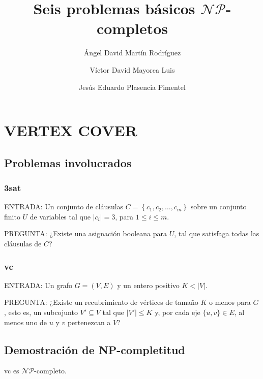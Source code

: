 \documentclass[11pt, a4paper]{memoir}
\title{\Huge Seis problemas básicos $\mathcal{NP}$-completos}
\author{Ángel David Martín Rodríguez}
\author{Víctor David Mayorca Luis}
\author{Jesús Eduardo Plasencia Pimentel}
\affil{Grado en Ingeniería Informática. Universidad de La Laguna}
\begin{document}
\maketitle

\chapter{VERTEX COVER}

\section{Problemas involucrados}

\subsection*{\gls{3sat}}

\noindent ENTRADA: Un conjunto de cláusulas $C=\left \{c_1, c_2, \dots, c_m \right \}$ sobre un conjunto finito $U$ de variables tal que $|c_i|=3$, para $1\le i \le m$.

\noindent PREGUNTA: ¿Existe una asignación booleana para $U$, tal que satisfaga todas las cláusulas de $C$? 

\subsection*{\gls{vc}}

\noindent ENTRADA: Un grafo $G = (V,E)$ y un entero positivo $K < |V|$.

\noindent PREGUNTA: ¿Existe un recubrimiento de vértices de tamaño $K$ o menos para $G$, esto es, un subcojunto $V' \subseteq V$ tal que $|V'|\le K$ y, por cada eje $\{u,v\} \in E$, al menos uno de $u$ y $v$ pertenezcan a $V$?

\section{Demostración de NP-completitud}

\begin{thm}
	\gls{vc} es $\mathcal{NP}$-completo.
\end{thm}
\end{document}
